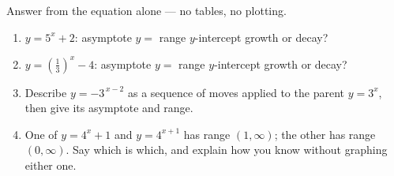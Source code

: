 \documentclass[10pt]{article}
\begin{document}
\begin{practicebox}
Answer from the equation alone --- no tables, no plotting.
\begin{enumerate}[leftmargin=1.7em, itemsep=7pt]
  \item $y=5^{x}+2$: \quad asymptote $y=$  \quad range  \quad
        $y$-intercept  \quad growth or decay? 

  \item $y=\left(\frac{1}{3}\right)^{x}-4$: \quad asymptote $y=$  \quad range
         \quad $y$-intercept  \quad growth or decay? 

  \item Describe $y=-3^{\,x-2}$ as a sequence of moves applied to the parent $y=3^{x}$, then give its
        asymptote and range.

  \item One of $y=4^{x}+1$ and $y=4^{x+1}$ has range $(1,\infty)$; the other has range $(0,\infty)$.
        Say which is which, and explain how you know without graphing either one.
\end{enumerate}
\end{practicebox}
\end{document}

